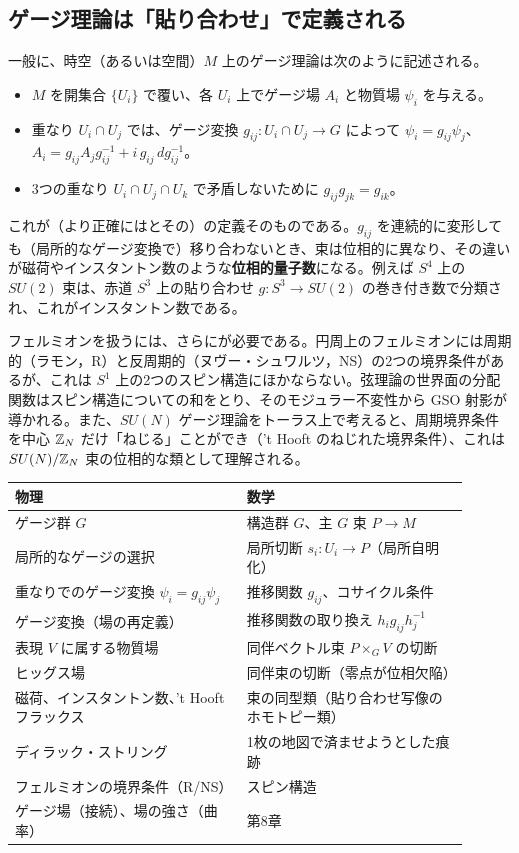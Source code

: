 \subsection*{ゲージ理論は「貼り合わせ」で定義される}
一般に、時空（あるいは空間）$M$ 上のゲージ理論は次のように記述される。
\begin{itemize}
\item $M$ を開集合 $\{U_i\}$ で覆い、各 $U_i$ 上でゲージ場 $A_i$ と物質場 $\psi_i$ を与える。
\item 重なり $U_i\cap U_j$ では、ゲージ変換 $g_{ij}\colon U_i\cap U_j\to G$ によって $\psi_i=g_{ij}\psi_j$、$A_i=g_{ij}A_jg_{ij}^{-1}+i\,g_{ij}\,dg_{ij}^{-1}$。
\item 3つの重なり $U_i\cap U_j\cap U_k$ で矛盾しないために $g_{ij}g_{jk}=g_{ik}$。
\end{itemize}
これが（より正確にはとその）の定義そのものである。$g_{ij}$ を連続的に変形しても（局所的なゲージ変換で）移り合わないとき、束は位相的に異なり、その違いが磁荷やインスタントン数のような\textbf{位相的量子数}になる。例えば $S^4$ 上の $SU(2)$ 束は、赤道 $S^3$ 上の貼り合わせ $g\colon S^3\to SU(2)$ の巻き付き数で分類され、これがインスタントン数である。

フェルミオンを扱うには、さらにが必要である。円周上のフェルミオンには周期的（ラモン，R）と反周期的（ヌヴー・シュワルツ，NS）の2つの境界条件があるが、これは $S^1$ 上の2つのスピン構造にほかならない。弦理論の世界面の分配関数はスピン構造についての和をとり、そのモジュラー不変性から GSO 射影が導かれる。また、$SU(N)$ ゲージ理論をトーラス上で考えると、周期境界条件を中心 $\mathbb{Z}_N$ だけ「ねじる」ことができ（'t Hooft のねじれた境界条件）、これは $SU(N)/\mathbb{Z}_N$ 束の位相的な類として理解される。

\begin{physbox}[：本章の辞書]
\begin{center}
\small
\begin{tabular}{p{0.46\linewidth}p{0.44\linewidth}}
物理 & 数学\\ \hline
ゲージ群 $G$ & 構造群 $G$、主 $G$ 束 $P\to M$\\
局所的なゲージの選択 & 局所切断 $s_i\colon U_i\to P$（局所自明化）\\
重なりでのゲージ変換 $\psi_i=g_{ij}\psi_j$ & 推移関数 $g_{ij}$、コサイクル条件\\
ゲージ変換（場の再定義） & 推移関数の取り換え $h_ig_{ij}h_j^{-1}$\\
表現 $V$ に属する物質場 & 同伴ベクトル束 $P\times_GV$ の切断\\
ヒッグス場 & 同伴束の切断（零点が位相欠陥）\\
磁荷、インスタントン数、't Hooft フラックス & 束の同型類（貼り合わせ写像のホモトピー類）\\
ディラック・ストリング & 1枚の地図で済ませようとした痕跡\\
フェルミオンの境界条件（R/NS） & スピン構造\\
ゲージ場（接続）、場の強さ（曲率） & 第8章
\end{tabular}
\end{center}
\end{physbox}

